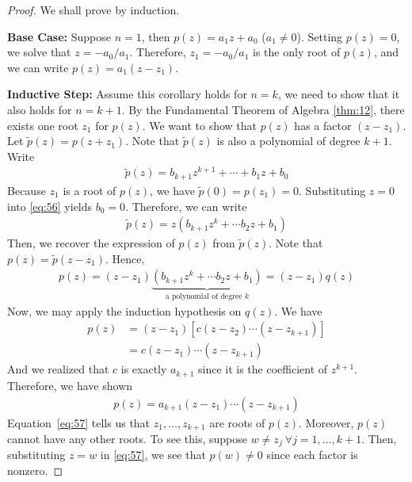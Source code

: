 \documentclass[thmcnt=section, color=cyan, 12pt]{my-elegantbook}
\begin{document}
\begin{proof}
    We shall prove by induction.

    \noindent\textbf{Base Case:} Suppose $n = 1$, then $p(z) = a_1 z + a_0$ ($a_1 \neq 0$). Setting $p(z) = 0$, we solve that $z = -a_0 / a_1$. Therefore, $z_1 = -a_0 / a_1$ is the only root of $p(z)$, and we can write $p(z) = a_1(z - z_1)$.

    \noindent\textbf{Inductive Step:} Assume this corollary holds for $n = k$, we need to show that it also holds for $n = k + 1$.
    By the Fundamental Theorem of Algebra \ref{thm:12}, there exists one root $z_1$ for $p(z)$.
    We want to show that $p(z)$ has a factor $(z - z_1)$.
    Let $\tilde{p}(z) = p(z + z_1)$.
    Note that $\tilde{p}(z)$ is also a polynomial of degree $k + 1$.
    Write
    \begin{align}
        \tilde{p}(z) = b_{k+1} z^{k+1} + \cdots + b_1 z + b_0
        \label{eq:56}
    \end{align}
    Because $z_1$ is a root of $p(z)$, we have $\tilde{p}(0) = p(z_1) = 0$. Substituting $z=0$ into \eqref{eq:56} yields $b_0 = 0$.
    Therefore, we can write
    \begin{align*}
        \tilde{p}(z) = z (b_{k+1} z^{k} + \cdots b_2 z + b_1)
    \end{align*}
    Then, we recover the expression of $p(z)$ from $\tilde{p}(z)$.
    Note that $p(z) = \tilde{p}(z - z_1)$.
    Hence,
    \begin{align*}
        p(z) = (z - z_1) \underbrace{(b_{k+1} z^{k} + \cdots b_2 z + b_1)}_{\text{a polynomial of degree $k$}}
        = (z - z_1) q(z)
    \end{align*}
    Now, we may apply the induction hypothesis on $q(z)$.
    We have
    \begin{align*}
        p(z) & = (z - z_1) [c (z - z_2) \cdots (z - z_{k+1})] \\
             & = c (z - z_1) \cdots (z - z_{k+1})
    \end{align*}
    And we realized that $c$ is exactly $a_{k+1}$ since it is the coefficient of $z^{k+1}$.
    Therefore, we have shown
    \begin{align}
        p(z) = a_{k+1} (z - z_1) \cdots (z - z_{k+1})
        \label{eq:57}
    \end{align}
    Equation~\eqref{eq:57} tells us that $z_1, \ldots, z_{k+1}$ are roots of $p(z)$.
    Moreover, $p(z)$ cannot have any other roots. To see this, suppose $w \neq z_j \ \forall j=1, \ldots, k+1$. Then, substituting $z = w$ in \eqref{eq:57}, we see that $p(w) \neq 0$ since each factor is nonzero.
\end{proof}




\printbibliography[heading=bibintoc, title=References]


\printindex
\end{document}
